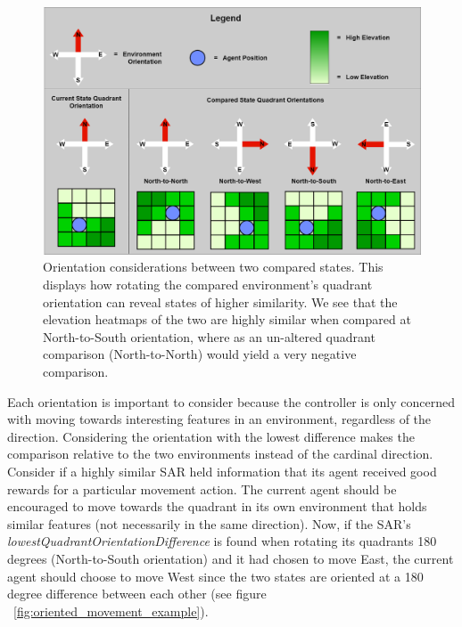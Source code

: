 \begin{figure}[!htb]
  \includegraphics[width=1.0\columnwidth]{Figures/quadrant_orientations.png}
  \caption{Orientation considerations between two compared states. This displays how rotating the compared environment's quadrant orientation can reveal states of higher similarity. We see that the elevation heatmaps of the two are highly similar when compared at North-to-South orientation, where as an un-altered quadrant comparison (North-to-North) would yield a very negative comparison.}
  \label{fig:quadrant_orientations}
\end{figure}

Each orientation is important to consider because the controller is only concerned with moving towards interesting features in an environment, regardless of the direction.
Considering the orientation with the lowest difference makes the comparison relative to the two environments instead of the cardinal direction.
Consider if a highly similar SAR held information that its agent received good rewards for a particular movement action.
The current agent should be encouraged to move towards the quadrant in its own environment that holds similar features (not necessarily in the same direction).
Now, if the SAR's \textit{lowestQuadrantOrientationDifference} is found when rotating its quadrants 180 degrees (North-to-South orientation) and it had chosen to move East, the current agent should choose to move West since the two states are oriented at a 180 degree difference between each other (see figure ~\ref{fig:oriented_movement_example}).

